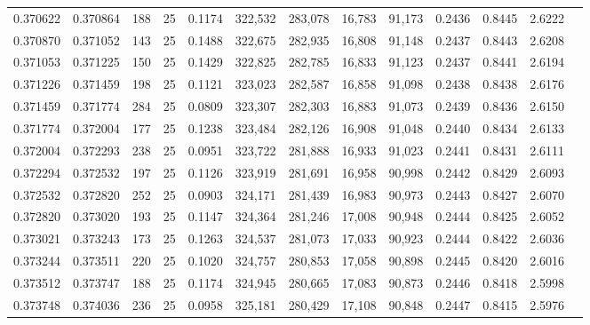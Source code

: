 \begin{tabular}{rrrrrrrrrrrrr}
0.370622 & 0.370864 &   188 &  25 &                                     0.1174 & 322,532 & 283,078 &  16,783 &  91,173 & 0.2436 & 0.8445 & 2.6222 \\
0.370870 & 0.371052 &   143 &  25 &                                     0.1488 & 322,675 & 282,935 &  16,808 &  91,148 & 0.2437 & 0.8443 & 2.6208 \\
0.371053 & 0.371225 &   150 &  25 &                                     0.1429 & 322,825 & 282,785 &  16,833 &  91,123 & 0.2437 & 0.8441 & 2.6194 \\
0.371226 & 0.371459 &   198 &  25 &                                     0.1121 & 323,023 & 282,587 &  16,858 &  91,098 & 0.2438 & 0.8438 & 2.6176 \\
0.371459 & 0.371774 &   284 &  25 &                                     0.0809 & 323,307 & 282,303 &  16,883 &  91,073 & 0.2439 & 0.8436 & 2.6150 \\
0.371774 & 0.372004 &   177 &  25 &                                     0.1238 & 323,484 & 282,126 &  16,908 &  91,048 & 0.2440 & 0.8434 & 2.6133 \\
0.372004 & 0.372293 &   238 &  25 &                                     0.0951 & 323,722 & 281,888 &  16,933 &  91,023 & 0.2441 & 0.8431 & 2.6111 \\
0.372294 & 0.372532 &   197 &  25 &                                     0.1126 & 323,919 & 281,691 &  16,958 &  90,998 & 0.2442 & 0.8429 & 2.6093 \\
0.372532 & 0.372820 &   252 &  25 &                                     0.0903 & 324,171 & 281,439 &  16,983 &  90,973 & 0.2443 & 0.8427 & 2.6070 \\
0.372820 & 0.373020 &   193 &  25 &                                     0.1147 & 324,364 & 281,246 &  17,008 &  90,948 & 0.2444 & 0.8425 & 2.6052 \\
0.373021 & 0.373243 &   173 &  25 &                                     0.1263 & 324,537 & 281,073 &  17,033 &  90,923 & 0.2444 & 0.8422 & 2.6036 \\
0.373244 & 0.373511 &   220 &  25 &                                     0.1020 & 324,757 & 280,853 &  17,058 &  90,898 & 0.2445 & 0.8420 & 2.6016 \\
0.373512 & 0.373747 &   188 &  25 &                                     0.1174 & 324,945 & 280,665 &  17,083 &  90,873 & 0.2446 & 0.8418 & 2.5998 \\
0.373748 & 0.374036 &   236 &  25 &                                     0.0958 & 325,181 & 280,429 &  17,108 &  90,848 & 0.2447 & 0.8415 & 2.5976 \\

\end{tabular}

